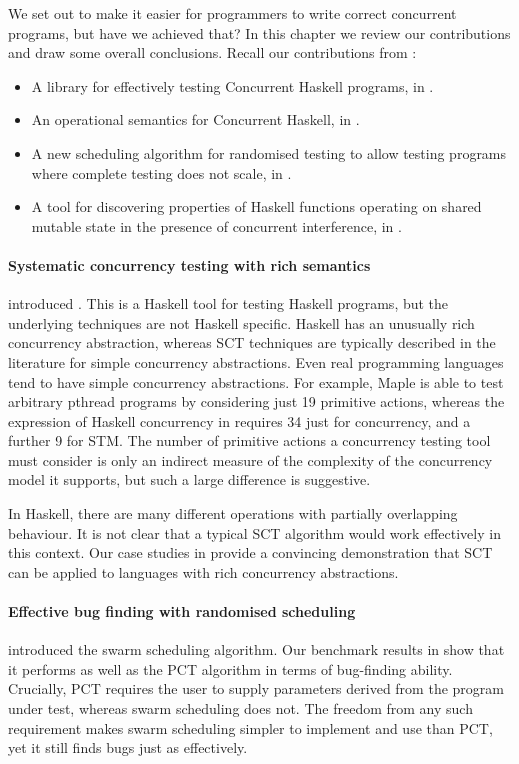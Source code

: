 We set out to make it easier for programmers to write correct
concurrent programs, but have we achieved that?  In this chapter we
review our contributions and draw some overall conclusions.  Recall
our contributions from :

\begin{itemize}
\item A library for effectively testing Concurrent Haskell programs,
  in .
\item An operational semantics for Concurrent Haskell, in
  .
\item A new scheduling algorithm for randomised testing to allow
  testing programs where complete testing does not scale, in
  .
\item A tool for discovering properties of Haskell functions operating
  on shared mutable state in the presence of concurrent interference,
  in .
\end{itemize}

\paragraph{Systematic concurrency testing with rich semantics}
 introduced \dejafu{}.  This is a Haskell tool for
testing Haskell programs, but the underlying techniques are not
Haskell specific.  Haskell has an unusually rich concurrency
abstraction, whereas SCT techniques are typically described in the
literature for simple concurrency abstractions.  Even real programming
languages tend to have simple concurrency abstractions.  For example,
Maple\cite{yu2012} is able to test arbitrary pthread programs by
considering just 19 primitive actions, whereas the expression of
Haskell concurrency in \dejafu{} requires 34 just for concurrency, and
a further 9 for STM.  The number of primitive actions a concurrency
testing tool must consider is only an indirect measure of the
complexity of the concurrency model it supports, but such a large
difference is suggestive.

In Haskell, there are many different operations with partially
overlapping behaviour.  It is not clear that a typical SCT algorithm
would work effectively in this context.  Our case studies in
 provide a convincing demonstration that
SCT can be applied to languages with rich concurrency abstractions.

\paragraph{Effective bug finding with randomised scheduling}
 introduced the swarm scheduling algorithm.  Our
benchmark results in  show that it performs
as well as the PCT algorithm\cite{burckhardt2010} in terms of
bug-finding ability.  Crucially, PCT requires the user to supply
parameters derived from the program under test, whereas swarm
scheduling does not.  The freedom from any such requirement makes
swarm scheduling simpler to implement and use than PCT, yet it still
finds bugs just as effectively.

